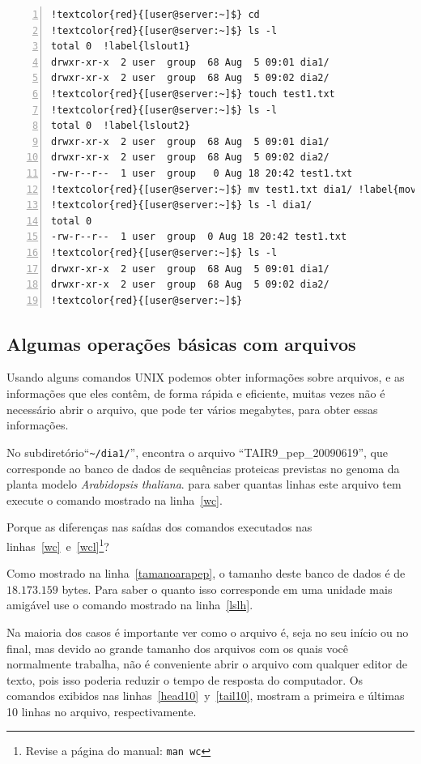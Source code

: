 \documentclass[letter,11pt]{book}
\begin{document}
\begin{Verbatim}[commandchars=!\{\},numbers=left,firstnumber=last,label=Organizando aquivos e direitorios,frame=topline,fontsize=\scriptsize]
!textcolor{red}{[user@server:~]$} cd
!textcolor{red}{[user@server:~]$} ls -l
total 0  !label{lslout1}
drwxr-xr-x  2 user  group  68 Aug  5 09:01 dia1/
drwxr-xr-x  2 user  group  68 Aug  5 09:02 dia2/
!textcolor{red}{[user@server:~]$} touch test1.txt
!textcolor{red}{[user@server:~]$} ls -l
total 0  !label{lslout2}
drwxr-xr-x  2 user  group  68 Aug  5 09:01 dia1/
drwxr-xr-x  2 user  group  68 Aug  5 09:02 dia2/
-rw-r--r--  1 user  group   0 Aug 18 20:42 test1.txt
!textcolor{red}{[user@server:~]$} mv test1.txt dia1/ !label{movertest}
!textcolor{red}{[user@server:~]$} ls -l dia1/
total 0
-rw-r--r--  1 user  group  0 Aug 18 20:42 test1.txt
!textcolor{red}{[user@server:~]$} ls -l
drwxr-xr-x  2 user  group  68 Aug  5 09:01 dia1/
drwxr-xr-x  2 user  group  68 Aug  5 09:02 dia2/
!textcolor{red}{[user@server:~]$}
\end{Verbatim} 

\subsection{Algumas operações básicas com arquivos}
Usando alguns comandos UNIX podemos obter informações sobre arquivos, e as informações que eles contêm, de forma rápida e eficiente, muitas vezes não é necessário abrir o arquivo, que pode ter vários megabytes, para obter essas informações.

No subdiretório``\Verb+~/dia1/+'', encontra o arquivo ``TAIR9\_pep\_20090619'', que corresponde ao banco de dados de sequências proteicas previstas no genoma da planta modelo \textit{Arabidopsis thaliana}. para saber quantas linhas este arquivo tem execute o comando mostrado na linha~\ref{wc}.

Porque as diferenças nas saídas dos comandos executados nas linhas~\ref{wc}~e~\ref{wcl}\footnote{Revise a página do manual: \Verb+man wc+}?

Como mostrado na linha~\ref{tamanoarapep}, o tamanho deste banco de dados é de $18.173.159$ bytes. Para saber o quanto isso corresponde em uma unidade mais amigável use o comando mostrado na linha~\ref{lslh}.

Na maioria dos casos é importante ver como o arquivo é, seja no seu início ou no final, mas devido ao grande tamanho dos arquivos com os quais você normalmente trabalha, não é conveniente abrir o arquivo com qualquer editor de texto, pois isso poderia reduzir o tempo de resposta do computador. Os comandos exibidos nas linhas~\ref{head10}~y~\ref{tail10}, mostram a primeira e últimas 10 linhas no arquivo, respectivamente.
\end{document}
